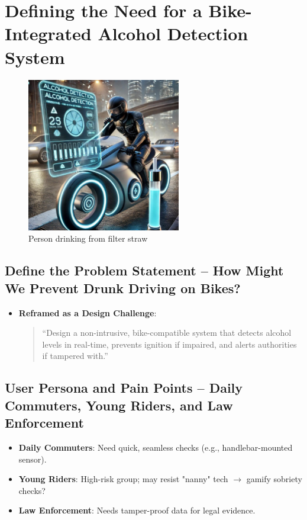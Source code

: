 \documentclass{article}
\begin{document}
\section{Defining the Need for a Bike-Integrated Alcohol Detection System}
\begin{figure}[h!]
    \centering
    \includegraphics[width=0.6\textwidth]{2.1.jpg}
    \caption{Person drinking from filter straw}
    \label{fig:Drinking_water}
\end{figure}

\subsection{Define the Problem Statement -- How Might We Prevent Drunk Driving on Bikes?}
\begin{itemize}
    \item \textbf{Reframed as a Design Challenge}:
    \begin{quote}
        ``Design a non-intrusive, bike-compatible system that detects alcohol levels in real-time, prevents ignition if impaired, and alerts authorities if tampered with.''
    \end{quote}
\end{itemize}

\subsection{User Persona and Pain Points -- Daily Commuters, Young Riders, and Law Enforcement}
\begin{itemize}
    \item \textbf{Daily Commuters}: Need quick, seamless checks (e.g., handlebar-mounted sensor).
    \item \textbf{Young Riders}: High-risk group; may resist "nanny" tech $\rightarrow$ gamify sobriety checks?
    \item \textbf{Law Enforcement}: Needs tamper-proof data for legal evidence.
\end{itemize}
\end{document}
